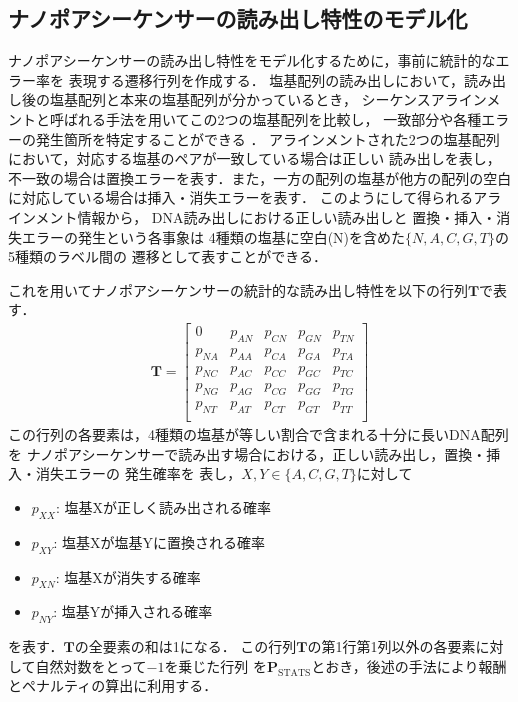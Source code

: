\documentclass[sotsuron]{kuee}
\begin{document}
\subsection{ナノポアシーケンサーの読み出し特性のモデル化} \label{stat_model}
ナノポアシーケンサーの読み出し特性をモデル化するために，事前に統計的なエラー率を
表現する遷移行列を作成する．
塩基配列の読み出しにおいて，読み出し後の塩基配列と本来の塩基配列が分かっているとき，
シーケンスアラインメントと呼ばれる手法を用いてこの2つの塩基配列を比較し，
一致部分や各種エラーの発生箇所を特定することができる
\cite{GOTOH1982705}．
アラインメントされた2つの塩基配列において，対応する塩基のペアが一致している場合は正しい
読み出しを表し，不一致の場合は置換エラーを表す．また，一方の配列の塩基が他方の配列の空白
に対応している場合は挿入・消失エラーを表す．
このようにして得られるアラインメント情報から，
DNA読み出しにおける正しい読み出しと
置換・挿入・消失エラーの発生という各事象は
4種類の塩基に空白(N)を含めた$\{N,A, C, G, T\}$の5種類のラベル間の
遷移として表すことができる．

これを用いてナノポアシーケンサーの統計的な読み出し特性を以下の行列$\bm{T}$で表す．
\begin{align}
  \bm{T} = \begin{bmatrix}
    0 & p_{AN} & p_{CN} & p_{GN} & p_{TN} \\
    p_{NA} & p_{AA} & p_{CA} & p_{GA} & p_{TA} \\
    p_{NC} & p_{AC} & p_{CC} & p_{GC} & p_{TC} \\
    p_{NG} & p_{AG} & p_{CG} & p_{GG} & p_{TG} \\
    p_{NT} & p_{AT} & p_{CT} & p_{GT} & p_{TT} \\
  \end{bmatrix}
\end{align}
この行列の各要素は，4種類の塩基が等しい割合で含まれる十分に長いDNA配列を
ナノポアシーケンサーで読み出す場合における，正しい読み出し，置換・挿入・消失エラーの
発生確率を
表し，$X,Y \in \{A,C,G,T\}$に対して
\begin{itemize}
  \item $p_{XX}$: 塩基Xが正しく読み出される確率
  \item $p_{XY}$: 塩基Xが塩基Yに置換される確率
  \item $p_{XN}$: 塩基Xが消失する確率
  \item $p_{NY}$: 塩基Yが挿入される確率
\end{itemize}
を表す．$\bm{T}$の全要素の和は1になる．
この行列$\bm{T}$の第1行第1列以外の各要素に対して自然対数をとって$-1$を乗じた行列
を$\bm{P}_{\mathrm{STATS}}$とおき，後述の手法により報酬とペナルティの算出に利用する．
\end{document}
